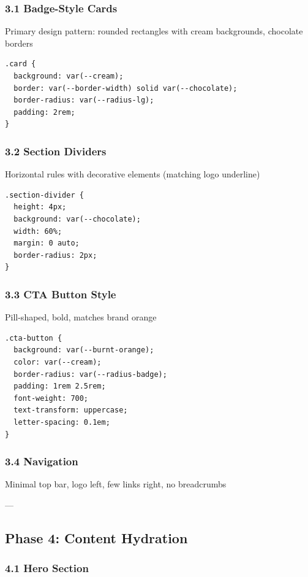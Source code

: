 \documentclass{book}
\begin{document}
\begin{itemize}
\begin{itemize}
\begin{itemize}
\begin{itemize}
\subsubsection{3.1 Badge-Style Cards}
Primary design pattern: rounded rectangles with cream backgrounds, chocolate borders

\begin{verbatim}
.card {
  background: var(--cream);
  border: var(--border-width) solid var(--chocolate);
  border-radius: var(--radius-lg);
  padding: 2rem;
}

\end{verbatim}

\subsubsection{3.2 Section Dividers}
Horizontal rules with decorative elements (matching logo underline)

\begin{verbatim}
.section-divider {
  height: 4px;
  background: var(--chocolate);
  width: 60%;
  margin: 0 auto;
  border-radius: 2px;
}

\end{verbatim}

\subsubsection{3.3 CTA Button Style}
Pill-shaped, bold, matches brand orange

\begin{verbatim}
.cta-button {
  background: var(--burnt-orange);
  color: var(--cream);
  border-radius: var(--radius-badge);
  padding: 1rem 2.5rem;
  font-weight: 700;
  text-transform: uppercase;
  letter-spacing: 0.1em;
}

\end{verbatim}

\subsubsection{3.4 Navigation}
Minimal top bar, logo left, few links right, no breadcrumbs

---

\subsection{Phase 4: Content Hydration}

\subsubsection{4.1 Hero Section}
\end{itemize}
\end{itemize}
\end{itemize}
\end{itemize}
\end{document}
